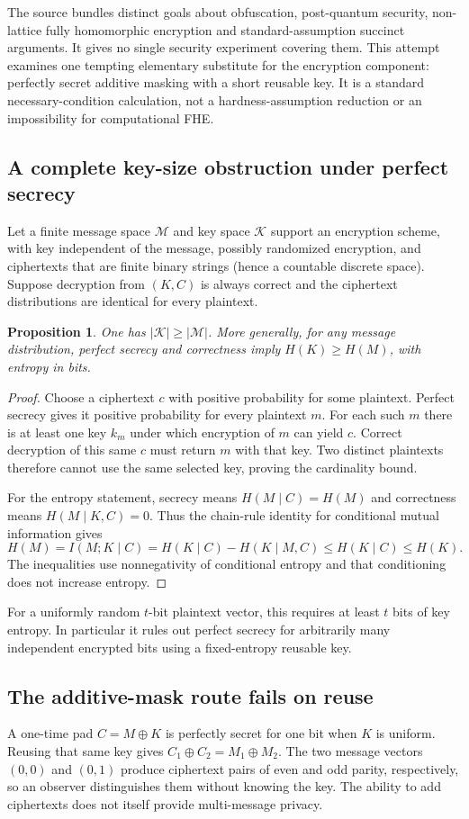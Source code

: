 \documentclass[11pt]{article}
\newtheorem{proposition}{Proposition}
\begin{document}
The source bundles distinct goals about obfuscation, post-quantum security, non-lattice fully homomorphic encryption and standard-assumption succinct arguments. It gives no single security experiment covering them. This attempt examines one tempting elementary substitute for the encryption component: perfectly secret additive masking with a short reusable key. It is a standard necessary-condition calculation, not a hardness-assumption reduction or an impossibility for computational FHE.
\subsection{A complete key-size obstruction under perfect secrecy}
Let a finite message space $\mathcal M$ and key space $\mathcal K$ support an encryption scheme, with key independent of the message, possibly randomized encryption, and ciphertexts that are finite binary strings (hence a countable discrete space). Suppose decryption from $(K,C)$ is always correct and the ciphertext distributions are identical for every plaintext.
\begin{proposition}
One has $|\mathcal K|\ge|\mathcal M|$. More generally, for any message distribution, perfect secrecy and correctness imply $H(K)\ge H(M)$, with entropy in bits.
\end{proposition}
\begin{proof}
Choose a ciphertext $c$ with positive probability for some plaintext. Perfect secrecy gives it positive probability for every plaintext $m$. For each such $m$ there is at least one key $k_m$ under which encryption of $m$ can yield $c$. Correct decryption of this same $c$ must return $m$ with that key. Two distinct plaintexts therefore cannot use the same selected key, proving the cardinality bound.

For the entropy statement, secrecy means $H(M\mid C)=H(M)$ and correctness means $H(M\mid K,C)=0$. Thus the chain-rule identity for conditional mutual information gives
\[
 H(M)=I(M;K\mid C)=H(K\mid C)-H(K\mid M,C)\le H(K\mid C)\le H(K).
\]
The inequalities use nonnegativity of conditional entropy and that conditioning does not increase entropy.
\end{proof}
For a uniformly random $t$-bit plaintext vector, this requires at least $t$ bits of key entropy. In particular it rules out perfect secrecy for arbitrarily many independent encrypted bits using a fixed-entropy reusable key.
\subsection{The additive-mask route fails on reuse}
A one-time pad $C=M\oplus K$ is perfectly secret for one bit when $K$ is uniform. Reusing that same key gives $C_1\oplus C_2=M_1\oplus M_2$. The two message vectors $(0,0)$ and $(0,1)$ produce ciphertext pairs of even and odd parity, respectively, so an observer distinguishes them without knowing the key. The ability to add ciphertexts does not itself provide multi-message privacy.
\end{document}
